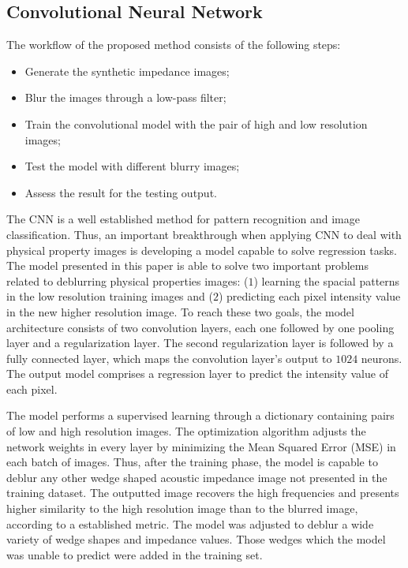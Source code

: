 \documentclass[conference,compsoc]{IEEEtran}
\begin{document}
\subsection{Convolutional Neural Network}
The workflow of the proposed method consists of the following
steps:
\begin{itemize}
 \item Generate the synthetic impedance images;
 \item Blur the images through a low-pass filter;
 \item Train the convolutional model with the pair of high and low resolution images;
 \item Test the model with different blurry images;
 \item Assess the result for the testing output.
\end{itemize}

The CNN is a well established method for
pattern recognition and image classification.
Thus, an important breakthrough when applying CNN to
deal with physical property images is developing a model
capable to solve regression tasks. The model presented in this paper
is able to solve two important problems related to deblurring physical properties
images: ($1$) learning the spacial patterns in the low resolution
training images and ($2$) predicting each pixel intensity value in the new
higher resolution image. To reach these two goals, the model architecture consists of two convolution layers,
each one followed by one pooling layer and a regularization layer. The second regularization layer is followed
by a fully connected layer, which maps the convolution layer's output to $1024$ neurons.
The output model comprises a regression layer to predict the intensity value of each pixel.

The model performs a supervised learning through a dictionary containing pairs of low
and high resolution images. The optimization algorithm adjusts the 
network weights in every layer by minimizing the Mean Squared Error (MSE)
in each batch of images. Thus, after the training phase, the model is capable
to deblur any other wedge shaped acoustic impedance image not presented in the training dataset. The outputted
image recovers the high frequencies and presents higher similarity
to the high resolution image than to the blurred image, according to a established metric.
The model was adjusted to deblur a wide variety of wedge shapes and impedance values.
Those wedges which the model was unable to predict were added in the training set.
\end{document}
